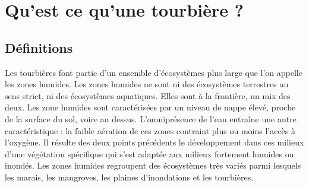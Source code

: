 \section{Qu'est ce qu'une tourbière ?}

\subsection{Définitions}
Les tourbières font partie d'un ensemble d'écosystèmes plus large que l'on appelle les zones humides.
Les zones humides ne sont ni des écosystèmes terrestres au sens strict, ni des écosystèmes aquatiques.
Elles sont à la frontière, un mix des deux.
Les zone humides sont caractérisées par un niveau de nappe élevé, proche de la surface du sol, voire au dessus.
L'omniprésence de l'eau entraîne une autre caractéristique : la faible aération de ces zones contraint plus ou moins l'accès à l'oxygène.
Il résulte des deux points précédents le développement dans ces milieux d'une végétation spécifique qui s'est adaptée aux milieux fortement humides ou inondés.
Les zones humides regroupent des écosystèmes très variés parmi lesquels les marais, les mangroves, les plaines d'inondations et les tourbières.

